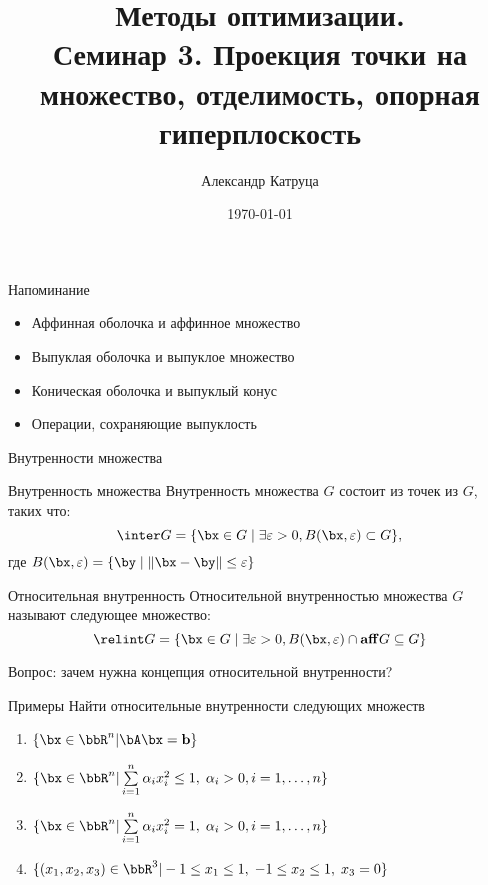 \documentclass[12pt]{beamer}
\title[Семинар 3]{Методы оптимизации. \\
 Семинар 3. Проекция точки на множество, отделимость, опорная гиперплоскость}
\author{Александр Катруца}
\institute{Московский физико-технический институт,\\
Факультет Управления и Прикладной Математики}
\date{\today}
\begin{document}
\begin{frame}
\maketitle
\end{frame}

\begin{frame}{Напоминание}
\begin{itemize}
\item Аффинная оболочка и аффинное множество
\item Выпуклая оболочка и выпуклое множество
\item Коническая оболочка и выпуклый конус
\item Операции, сохраняющие выпуклость
\end{itemize}
\end{frame}

\begin{frame}{Внутренности множества}

\begin{block}{Внутренность множества}
Внутренность множества $G$ состоит из точек из $G$, таких что:
\[ 
\inter G = \{ \bx \in G \; | \; \exists \varepsilon > 0, B(\bx, \varepsilon) \subset G\},
\]
где $B(\bx, \varepsilon) = \{ \by \; | \; \| \bx - \by \| \leq \varepsilon \}$
\end{block}

\begin{block}{Относительная внутренность}
Относительной внутренностью множества $G$ называют следующее множество: 
\[
\relint G = \{ \bx \in G \; | \; \exists \varepsilon > 0,  B(\bx, \varepsilon) \cap \mathbf{aff} G \subseteq G \}
\]
\end{block}
Вопрос: зачем нужна концепция относительной внутренности?
\end{frame}

\begin{frame}{Примеры}
Найти относительные внутренности следующих множеств
\begin{enumerate}
\item $\{ \bx \in \bbR^n | \bA\bx = \mathbf{b} \}$
\item $\{ \bx \in \bbR^n | \sum\limits_{i=1}^n \alpha_i x_i^2 \leq 1, \; \alpha_i > 0 , i = 1,\ldots, n \}$ 
\item $\{ \bx \in \bbR^n | \sum\limits_{i=1}^n \alpha_i x_i^2 = 1, \; \alpha_i > 0 , i = 1,\ldots, n \}$ 
\item $\{ (x_1, x_2, x_3) \in \bbR^3 | -1 \leq x_1 \leq 1, \; -1 \leq x_2 \leq 1, \; x_3 = 0 \}$
\end{enumerate}
\end{frame}
\end{document}
